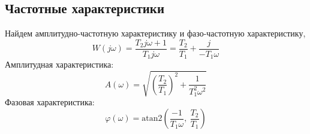 \subsection{Частотные характеристики}
\noindent Найдем амплитудно-частотную характеристику и фазо-частотную характеристику,
\begin{equation}
    W(j\omega) = \frac{T_2j\omega + 1}{T_1j\omega} = \frac{T_2}{T_1} + \frac{j}{-T_1\omega}
\end{equation}
Амплитудная характеристика:
\begin{equation}
    A(\omega) = \sqrt{\left(\frac{T_2}{T_1}\right)^2 + \frac{1}{T_1^2\omega^2}}
\end{equation}
Фазовая характеристика:
\begin{equation}
    \varphi(\omega) = \text{atan2}\left(\frac{-1}{T_1\omega},~\frac{T_2}{T_1}\right)
\end{equation}

